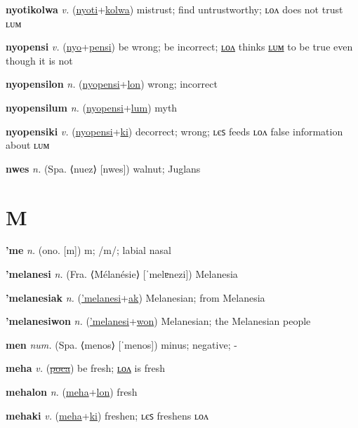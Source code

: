 \textbf{\hypertarget{nyotikolwa}{nyotikolwa}} \textit{v.} (\hyperlink{nyoti}{nyoti}+\allowbreak \hyperlink{kolwa}{kolwa})
mistrust; find untrustworthy; ʟᴏᴧ does not trust ʟᴜᴍ

\textbf{\hypertarget{nyopensi}{nyopensi}} \textit{v.} (\hyperlink{nyo}{nyo}+\allowbreak \hyperlink{pensi}{pensi})
be wrong; be incorrect; \hyperlink{nyopensilon}{ʟᴏᴧ} thinks \hyperlink{nyopensilum}{ʟᴜᴍ} to be true even though it is not

\textbf{\hypertarget{nyopensilon}{nyopensilon}} \textit{n.} (\hyperlink{nyopensi}{nyopensi}+\allowbreak \hyperlink{lon}{lon})
wrong; incorrect

\textbf{\hypertarget{nyopensilum}{nyopensilum}} \textit{n.} (\hyperlink{nyopensi}{nyopensi}+\allowbreak \hyperlink{lum}{lum})
myth

\textbf{\hypertarget{nyopensiki}{nyopensiki}} \textit{v.} (\hyperlink{nyopensi}{nyopensi}+\allowbreak \hyperlink{ki}{ki})
decorrect; wrong; ʟєꜱ feeds ʟᴏᴧ false information about ʟᴜᴍ

\textbf{\hypertarget{nwes}{nwes}} \textit{n.} (Spa. ⟨nuez⟩ [nwes])
walnut; Juglans

\section{M}

\textbf{\hypertarget{'me}{'me}} \textit{n.} (ono. [m])
m; /m/; labial nasal

\textbf{\hypertarget{'melanesi}{'melanesi}} \textit{n.} (Fra. ⟨Mélanésie⟩ [ˈmelɐnezi])
Melanesia

\textbf{\hypertarget{'melanesiak}{'melanesiak}} \textit{n.} (\hyperlink{'melanesi}{'melanesi}+\allowbreak \hyperlink{ak}{ak})
Melanesian; from Melanesia

\textbf{\hypertarget{'melanesiwon}{'melanesiwon}} \textit{n.} (\hyperlink{'melanesi}{'melanesi}+\allowbreak \hyperlink{won}{won})
Melanesian; the Melanesian people

\textbf{\hypertarget{men}{men}} \textit{num.} (Spa. ⟨menos⟩ [ˈmenos])
minus; negative; -

\textbf{\hypertarget{meha}{meha}} \textit{v.} (\hyperlink{poca}{\sout{poca}})
be fresh; \hyperlink{mehalon}{ʟᴏᴧ} is fresh

\textbf{\hypertarget{mehalon}{mehalon}} \textit{n.} (\hyperlink{meha}{meha}+\allowbreak \hyperlink{lon}{lon})
fresh

\textbf{\hypertarget{mehaki}{mehaki}} \textit{v.} (\hyperlink{meha}{meha}+\allowbreak \hyperlink{ki}{ki})
freshen; ʟєꜱ freshens ʟᴏᴧ

